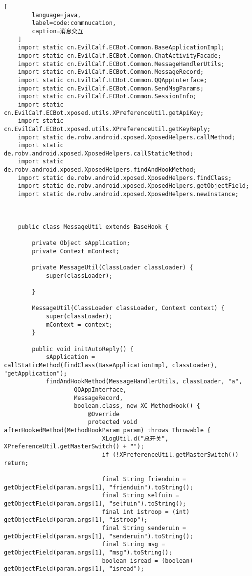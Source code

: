 \begin{appendices}
\begin{lstlisting}[
        language=java,
        label=code:commnucation,
        caption=消息交互
    ]
    import static cn.EvilCalf.ECBot.Common.BaseApplicationImpl;
    import static cn.EvilCalf.ECBot.Common.ChatActivityFacade;
    import static cn.EvilCalf.ECBot.Common.MessageHandlerUtils;
    import static cn.EvilCalf.ECBot.Common.MessageRecord;
    import static cn.EvilCalf.ECBot.Common.QQAppInterface;
    import static cn.EvilCalf.ECBot.Common.SendMsgParams;
    import static cn.EvilCalf.ECBot.Common.SessionInfo;
    import static cn.EvilCalf.ECBot.xposed.utils.XPreferenceUtil.getApiKey;
    import static cn.EvilCalf.ECBot.xposed.utils.XPreferenceUtil.getKeyReply;
    import static de.robv.android.xposed.XposedHelpers.callMethod;
    import static de.robv.android.xposed.XposedHelpers.callStaticMethod;
    import static de.robv.android.xposed.XposedHelpers.findAndHookMethod;
    import static de.robv.android.xposed.XposedHelpers.findClass;
    import static de.robv.android.xposed.XposedHelpers.getObjectField;
    import static de.robv.android.xposed.XposedHelpers.newInstance;
    
    
    
    public class MessageUtil extends BaseHook {
    
        private Object sApplication;
        private Context mContext;
    
        private MessageUtil(ClassLoader classLoader) {
            super(classLoader);
    
        }
    
        MessageUtil(ClassLoader classLoader, Context context) {
            super(classLoader);
            mContext = context;
        }
    
        public void initAutoReply() {
            sApplication = callStaticMethod(findClass(BaseApplicationImpl, classLoader), "getApplication");
            findAndHookMethod(MessageHandlerUtils, classLoader, "a",
                    QQAppInterface,
                    MessageRecord,
                    boolean.class, new XC_MethodHook() {
                        @Override
                        protected void afterHookedMethod(MethodHookParam param) throws Throwable {
                            XLogUtil.d("总开关", XPreferenceUtil.getMasterSwitch() + "");
                            if (!XPreferenceUtil.getMasterSwitch()) return;
    
                            final String frienduin = getObjectField(param.args[1], "frienduin").toString();
                            final String selfuin = getObjectField(param.args[1], "selfuin").toString();
                            final int istroop = (int) getObjectField(param.args[1], "istroop");
                            final String senderuin = getObjectField(param.args[1], "senderuin").toString();
                            final String msg = getObjectField(param.args[1], "msg").toString();
                            boolean isread = (boolean) getObjectField(param.args[1], "isread");
    

\end{lstlisting}
\end{appendices}
